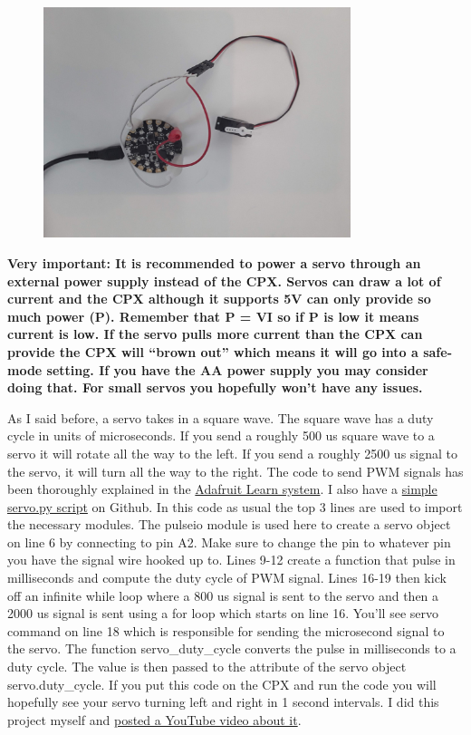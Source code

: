 \begin{figure}[H]
  \begin{center}
    \includegraphics[width=0.8\textwidth]{Figures/servo_circuit.jpeg}
  \end{center}
\end{figure}
{\bf Very important: It is recommended to power a servo through an external power supply instead of the CPX. Servos can draw a lot of current and the CPX although it supports 5V can only provide so much power (P). Remember that P = VI so if P is low it means current is low. If the servo pulls more current than the CPX can provide the CPX will “brown out” which means it will go into a safe-mode setting. If you have the AA power supply you may consider doing that. For small servos you hopefully won’t have any issues.}

As I said before, a servo takes in a square wave. The square wave has a duty cycle in units of microseconds. If you send a roughly 500 us square wave to a servo it will rotate all the way to the left. If you send a roughly 2500 us signal to the servo, it will turn all the way to the right. The code to send PWM signals has been thoroughly explained in the \href{https://learn.adafruit.com/using-servos-with-circuitpython/overview}{Adafruit Learn system}. I also have a \href{https://github.com/cmontalvo251/Microcontrollers/blob/master/Circuit_Playground/CircuitPython/Servo/servo.py}{simple servo.py script} on Github. In this code as usual the top 3 lines are used to import the necessary modules. The pulseio module is used here to create a servo object on line 6 by connecting to pin A2. Make sure to change the pin to whatever pin you have the signal wire hooked up to. Lines 9-12 create a function that pulse in milliseconds and compute the duty cycle of PWM signal. Lines 16-19 then kick off an infinite while loop where a 800 us signal is sent to the servo and then a 2000 us signal is sent using a for loop which starts on line 16. You’ll see servo command on line 18 which is responsible for sending the microsecond signal to the servo. The function servo\_duty\_cycle converts the pulse in milliseconds to a duty cycle. The value is then passed to the attribute of the servo object servo.duty\_cycle. If you put this code on the CPX and run the code you will hopefully see your servo turning left and right in 1 second intervals. I did this project myself and \href{https://youtu.be/ynlGiPZk5VM}{posted a YouTube video about it}. 

